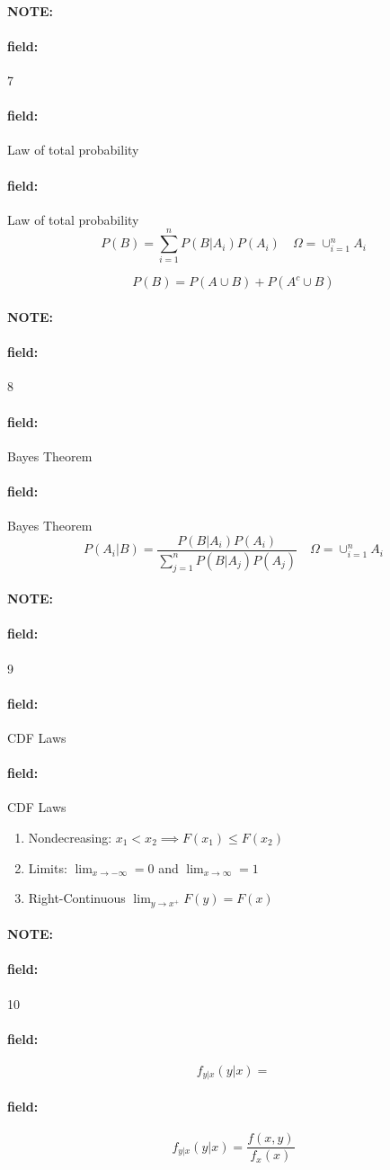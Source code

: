 \documentclass[12pt]{article}
\newenvironment{note}{\paragraph{NOTE:}}{}
\newenvironment{field}{\paragraph{field:}}{}
\begin{document}
\begin{note}
  \begin{field}
    \tiny 7
  \end{field}
  \begin{field}
    Law of total probability
  \end{field}
  \begin{field}
    Law of total probability
    $$P(B) = \sum_{i=1}^n P(B|A_i)P(A_i) \quad \Omega = \cup_{i=1}^n A_i$$

    $$P(B) = P(A \cup B) + P(A^c \cup B) $$
   \end{field}
\end{note}

\begin{note}
  \begin{field}
    \tiny 8
  \end{field}
  \begin{field}
    Bayes Theorem
  \end{field}
  \begin{field}
    Bayes Theorem
    $$P(A_i|B) = \frac{P(B|A_i)P(A_i)}{\sum_{j=1}^n P(B|A_j)P(A_j)} \quad \Omega = \cup_{i=1}^n A_i$$
  \end{field}
\end{note}

\begin{note}
  \begin{field}
    \tiny 9
  \end{field}
  \begin{field}
    CDF Laws
  \end{field}
  \begin{field}
    CDF Laws
    \begin{enumerate}
      \item Nondecreasing: $x_1 < x_2 \implies F(x_1) \leq F(x_2)$
      \item Limits: $\lim_{x \to -\infty}=0$ and $\lim_{x\to \infty} = 1$
      \item Right-Continuous $\lim_{y \to x^+}F(y) = F(x)$
    \end{enumerate}
  \end{field}
\end{note}

\begin{note}
  \begin{field}
    \tiny 10
  \end{field}
  \begin{field}
    $$f_{y|x}(y|x) = $$
  \end{field}
  \begin{field}
    $$f_{y|x}(y|x) = \frac{f(x,y)}{f_x(x)}$$
  \end{field}
\end{note}
\end{document}
